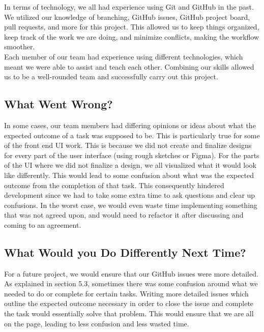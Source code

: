 \documentclass{article}
\begin{document}
In terms of technology, we all had experience using Git and GitHub in the past. We utilized our 
knowledge of branching, GitHub issues, GitHub project board, pull requests, and more for this project. 
This allowed us to keep things organized, keep track of the work we are doing, and minimize conflicts, 
making the workflow smoother.\\

Each member of our team had experience using different technologies, which meant we were able to 
assist and teach each other. Combining our skills allowed us to be a well-rounded team and successfully 
carry out this project.

\subsection{What Went Wrong?}


In some cases, our team members had differing opinions or ideas about what the expected outcome of a 
task was supposed to be. This is particularly true for some of the front end UI work. This is because 
we did not create and finalize designs for every part of the user interface (using rough sketches or 
Figma). For the parts of the UI where we did not finalize a design, we all visualized what it would 
look like differently. This would lead to some confusion about what was the expected outcome from the 
completion of that task. This consequently hindered development since we had to take some extra time 
to ask questions and clear up confusions. In the worst case, we would even waste time implementing 
something that was not agreed upon, and would need to refactor it after discussing and coming to an 
agreement.


\subsection{What Would you Do Differently Next Time?}


For a future project, we would ensure that our GitHub issues were more detailed. As explained in 
section 5.3, sometimes there was some confusion around what we needed to do or complete for certain 
tasks. Writing more detailed issues which outline the expected outcome necessary in order to close the 
issue and complete the task would essentially solve that problem. This would ensure that we are all on 
the page, leading to less confusion and less wasted time.
\end{document}
